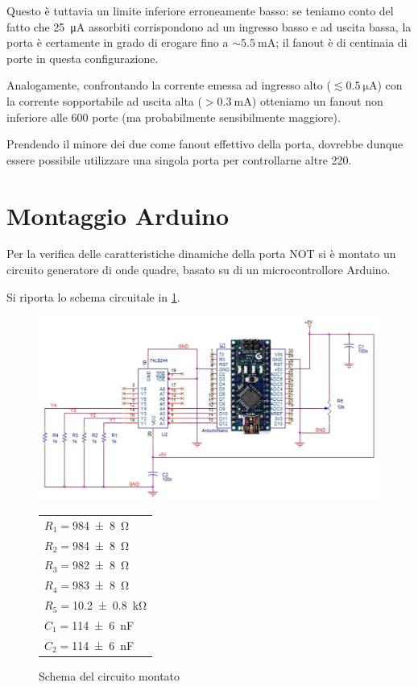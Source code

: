\documentclass[a4paper,11pt]{article}
\begin{document}
Questo è tuttavia un limite inferiore erroneamente basso: se teniamo conto
del fatto che \SI{25}{\uA} assorbiti corrispondono ad un ingresso basso e ad uscita bassa, la porta è certamente
in grado di	erogare fino a $\sim \SI{5.5}{\mA}$; il fanout è di centinaia
di porte in questa configurazione. 

Analogamente, confrontando la corrente
emessa ad ingresso alto ($\lesssim \SI{0.5}{\micro \ampere}$) con la
corrente sopportabile ad uscita alta ($ > \SI{0.3}{\mA}$) otteniamo un
fanout non inferiore alle 600 porte (ma probabilmente sensibilmente
maggiore).

Prendendo il minore dei due come fanout effettivo della porta,
dovrebbe dunque essere possibile utilizzare una singola porta per
controllarne altre 220.

\section{Montaggio Arduino}
Per la verifica delle caratteristiche dinamiche della porta NOT si è montato un circuito generatore di onde quadre, basato su di un microcontrollore Arduino. 

Si riporta lo schema circuitale in \figurename{ \ref{f:impulsatore}}. 

\begin{figure}[H]
	\begin{minipage}{0.7\textwidth}
		\centering
		\includegraphics[scale=0.27]{imp.png}
		\caption{Schema del circuito montato}
		\label{f:impulsatore}
	\end{minipage}
	\begin{minipage}{0.3\textwidth}
		\begin{tabular}{l}
			$R_{1}=$\SI{984 \pm 8}{\ohm} \\$R_{2}=$\SI{984 \pm 8}{\ohm} \\$R_{3}=$\SI{982 \pm 8}{\ohm} \\
			$R_{4}=$\SI{983 \pm 8}{\ohm} \\$R_{5}=$\SI{10.2 \pm 0.8}{\kilo \ohm} \\
		$C_{1}=$\SI{114 \pm 6}{\nano\farad} \\$C_{2}=$\SI{114  \pm 6}{\nano\farad}
		\end{tabular}
	\end{minipage}
\end{figure}
\end{document}
